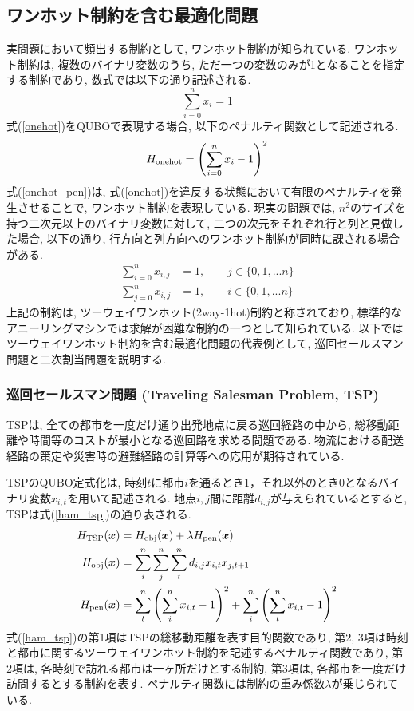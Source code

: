 \documentclass[submit,techrep,noauthor]{ipsj}
\begin{document}
\subsection{ワンホット制約を含む最適化問題}
実問題において頻出する制約として, ワンホット制約が知られている. ワンホット制約は, 複数のバイナリ変数のうち, ただ一つの変数のみが1となることを指定する制約であり, 数式では以下の通り記述される.
\begin{equation}
\sum_{i=0}^{n}x_{i} = 1 \label{onehot}
\end{equation}
式(\ref{onehot})をQUBOで表現する場合, 以下のペナルティ関数として記述される.
\begin{equation}
H_{{\rm onehot}}=\left(\sum_{i=0}^{n}x_{i} - 1\right)^{2} \label{onehot_pen}
\end{equation}
式(\ref{onehot_pen})は, 式(\ref{onehot})を違反する状態において有限のペナルティを発生させることで, ワンホット制約を表現している. 現実の問題では, $n^{2}$のサイズを持つ二次元以上のバイナリ変数に対して, 二つの次元をそれぞれ行と列と見做した場合, 以下の通り, 行方向と列方向へのワンホット制約が同時に課される場合がある.
\begin{align}
\sum_{i=0}^{n}x_{i, j} &= 1,\hspace{2em}j\in\{0,1,...n\}\\
\sum_{j=0}^{n}x_{i, j} &= 1,\hspace{2em}i\in\{0,1,...n\}
\end{align}
上記の制約は, ツーウェイワンホット(2way-1hot)制約と称されており\cite{yatabe}, 標準的なアニーリングマシンでは求解が困難な制約の一つとして知られている\cite{da3}. 以下ではツーウェイワンホット制約を含む最適化問題の代表例として, 巡回セールスマン問題と二次割当問題を説明する.

\subsubsection{巡回セールスマン問題 (Traveling Salesman Problem, TSP)}
TSPは, 全ての都市を一度だけ通り出発地点に戻る巡回経路の中から, 総移動距離や時間等のコストが最小となる巡回路を求める問題である. 物流における配送経路の策定や災害時の避難経路の計算等への応用が期待されている. 

TSPのQUBO定式化は, 時刻$t$に都市$i$を通るとき1，それ以外のとき0となるバイナリ変数$x_{i,t}$を用いて記述される. 
地点$i, j$間に距離$d_{i, j}$が与えられているとすると, TSPは式(\ref{ham_tsp})の通り表される.
\textcolor{blue}{
\begin{align}
H_{\rm{TSP}}(\bm{x}) &= H_{\rm{obj}}(\bm{x}) + \lambda H_{\rm{pen}}(\bm{x})\nonumber\\
H_{\rm{obj}}(\bm{x}) &= \sum_{i}^{n}\sum_{j}^{n}\sum_{t}^{n}d_{i,j}x_{i,t}x_{j,t+1}\nonumber\\
H_{\rm{pen}}(\bm{x}) &= \sum_{t}^{n}\left(\sum_{i}^{n}x_{i,t}-1\right)^{2} + \sum_{i}^{n}\left(\sum_{t}^{n}x_{i,t}-1\right)^{2} \label{ham_tsp}
\end{align}
}
式(\ref{ham_tsp})の第1項はTSPの総移動距離を表す目的関数であり, 第2, 3項は時刻と都市に関するツーウェイワンホット制約を記述するペナルティ関数であり, 第2項は, 各時刻で訪れる都市は一ヶ所だけとする制約, 第3項は, 各都市を一度だけ訪問するとする制約を表す. ペナルティ関数には制約の重み係数$\lambda$が乗じられている. 
\end{document}

